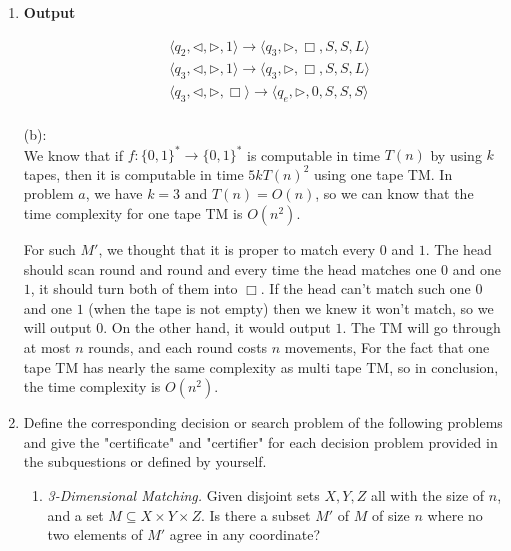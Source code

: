 \documentclass[12pt,a4paper]{article}
\makeatletter
\newtheorem*{solution}{Solution}
\theoremstyle{definition}
\renewenvironment{solution}[1][Solution] {\par\pushQED{\qed}\normalfont\topsep6\p@\@plus6\p@\relax\trivlist\item[\hskip\labelsep\bfseries#1\@addpunct{.}]\ignorespaces}{\popQED\endtrivlist\@endpefalse} \makeatother
\makeatother
\begin{document}
\begin{enumerate}
\begin{solution}
	\textbf{Output}

    \begin{equation*}
    \begin{aligned}
    &\langle q_2, \triangleleft, \triangleright, 1\rangle \rightarrow \langle q_3, \triangleright, \Box, S, S, L\rangle \\
    &\langle q_3, \triangleleft, \triangleright, 1\rangle \rightarrow \langle q_3, \triangleright, \Box, S, S, L\rangle \\
    &\langle q_3, \triangleleft, \triangleright, \Box\rangle \rightarrow \langle q_e, \triangleright, 0, S, S, S\rangle \\
    \end{aligned}
    \end{equation*}

	(b):\\
	
	We know that if $f:\{0,1\}^*\rightarrow \{0, 1\}^*$ is computable in time $T(n)$ by using $k$ tapes, then it is computable in time $5kT(n)^2$ using one tape TM. In problem $a$, we have $k=3$ and $T(n)=O(n)$, so we can know that the time complexity for one tape TM is $O(n^2)$.

	For such $M'$, we thought that it is proper to match every $0$ and $1$. The head should scan round and round and every time the head
	matches one $0$ and one $1$, it should turn both of them into $\Box$. If the head can't match such one $0$ and one $1$ (when the tape is not empty)
	then we knew it won't match, so we will output $0$. On the other hand, it would output $1$. The TM will go through at most $n$ rounds, and each round costs $n$ movements,
	For the fact that one tape TM has nearly the same complexity as multi tape TM, so in conclusion, the time complexity is $O(n^2)$.

\end{solution}
    
	
	\item Define the corresponding decision or search problem of the following problems and give the "certificate" and "certifier" for each decision problem provided in the subquestions or defined by yourself.
	
	\begin{enumerate}
	    \item
	    \textit{3-Dimensional Matching.}  Given disjoint sets $X,Y,Z$ all with the size of $n$, and a set $M \subseteq X\times Y\times Z$.  Is there a subset $M'$ of $M$ of size $n$ where no two elements of $M'$ agree in any coordinate?
	    

\end{enumerate}
\end{enumerate}
\end{document}
